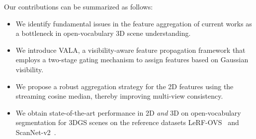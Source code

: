 Our contributions can be summarized as follows:
\begin{itemize}
    \item We identify fundamental issues in the feature aggregation of current works as a bottleneck in open-vocabulary 3D scene understanding.
    \item We introduce VALA, a visibility-aware feature propagation framework that employs a two-stage gating mechanism to assign features based on Gaussian visibility.
    \item We propose a robust aggregation strategy for the 2D features using the streaming cosine median, thereby improving multi-view consistency.
    \item We obtain state-of-the-art performance in 2D \textit{and} 3D on open-vocabulary segmentation for 3DGS scenes on the reference datasets LeRF-OVS~\cite{qin2024langsplat} and ScanNet-v2~\cite{dai2017scannet}.
\end{itemize}
